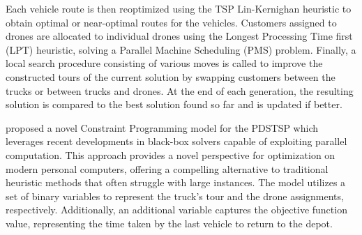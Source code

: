 \documentclass{article}
\begin{document}
	Each vehicle route is then reoptimized using the TSP Lin-Kernighan \cite{Lin-Kernighan2000} heuristic to obtain optimal or near-optimal routes for the vehicles. Customers assigned to drones are allocated to individual drones using the Longest Processing Time first (LPT) heuristic, solving a Parallel Machine Scheduling (PMS) problem. Finally, a local search procedure consisting of various moves is called to improve the constructed tours of the current solution by swapping customers between the trucks or between trucks and drones. At the end of each generation, the resulting solution is compared to the best solution found so far and is updated if better.
	\par
	\citeauthor{Montemanni2023} \cite{Montemanni2023} proposed a novel Constraint Programming model for the PDSTSP which leverages recent developments in black-box solvers \cite{Black-BoxSolvers} capable of exploiting parallel computation. This approach provides a novel perspective for optimization on modern personal computers, offering a compelling alternative to traditional heuristic methods that often struggle with large instances. The model utilizes a set of binary variables to represent the truck's tour and the drone assignments, respectively. Additionally, an additional variable captures the objective function value, representing the time taken by the last vehicle to return to the depot.
	\par
\end{document}
